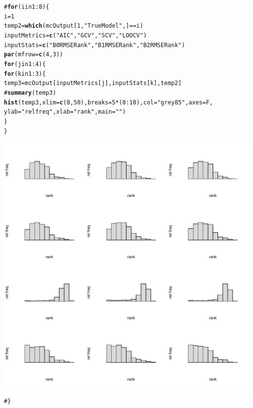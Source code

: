 \documentclass{article}\usepackage{graphicx, color}
\makeatletter
\def\maxwidth{ %
  \ifdim\Gin@nat@width>\linewidth
    \linewidth
  \else
    \Gin@nat@width
  \fi
}
\newcommand{\hlfunctioncall}[1]{\textcolor[rgb]{0.501960784313725,0,0.329411764705882}{\textbf{#1}}}%
\newcommand{\hlstring}[1]{\textcolor[rgb]{0.6,0.6,1}{#1}}%
\newcommand{\hlcomment}[1]{\textcolor[rgb]{0.180392156862745,0.6,0.341176470588235}{#1}}%
\newenvironment{kframe}{%
 \def\at@end@of@kframe{}%
 \ifinner\ifhmode%
  \def\at@end@of@kframe{\end{minipage}}%
  \begin{minipage}{\columnwidth}%
 \fi\fi%
 \def\FrameCommand##1{\hskip\@totalleftmargin \hskip-\fboxsep
 \colorbox{shadecolor}{##1}\hskip-\fboxsep
     \hskip-\linewidth \hskip-\@totalleftmargin \hskip\columnwidth}%
 \MakeFramed {\advance\hsize-\width
   \@totalleftmargin\z@ \linewidth\hsize
   \@setminipage}}%
 {\par\unskip\endMakeFramed%
 \at@end@of@kframe}
\newenvironment{knitrout}{}{} %
\makeatother
\begin{document}
\begin{knitrout}
\color{fgcolor}\begin{kframe}
\begin{alltt}
\hlcomment{# \hlfunctioncall{for} (i in 1:8) \{}
i = 1
temp2 = \hlfunctioncall{which}(mcOutput[1, \hlstring{"True Model"}, ] == i)
inputMetrics = \hlfunctioncall{c}(\hlstring{"AIC"}, \hlstring{"GCV"}, \hlstring{"SCV"}, \hlstring{"LOOCV"})
inputStats = \hlfunctioncall{c}(\hlstring{"B0RMSE Rank"}, \hlstring{"B1RMSE Rank"}, \hlstring{"B2RMSE Rank"})
\hlfunctioncall{par}(mfrow = \hlfunctioncall{c}(4, 3))
\hlfunctioncall{for} (j in 1:4) \{
    \hlfunctioncall{for} (k in 1:3) \{
        temp3 = mcOutput[inputMetrics[j], inputStats[k], temp2]
        \hlcomment{# \hlfunctioncall{summary}(temp3)}
        \hlfunctioncall{hist}(temp3, xlim = \hlfunctioncall{c}(0, 50), breaks = 5 * (0:10), col = \hlstring{"grey85"}, axes = F, 
            ylab = \hlstring{"rel freq"}, xlab = \hlstring{"rank"}, main = \hlstring{""})
    \}
\}
\end{alltt}
\end{kframe}\includegraphics[width=\maxwidth]{figure/BetaRankTabulations} \begin{kframe}\begin{alltt}
\hlcomment{# \}}
\end{alltt}
\end{kframe}
\end{knitrout}
\end{document}
